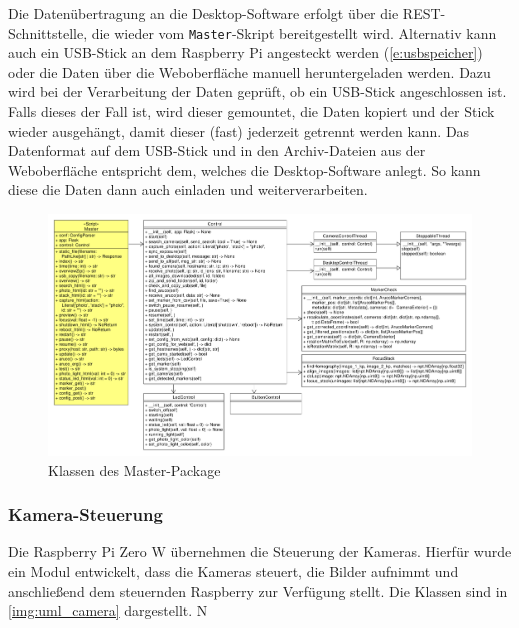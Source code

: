 \documentclass[./00PhotoBox.tex]{subfiles}
\begin{document}
Die Datenübertragung an die Desktop-Software erfolgt über die \Gls{REST}-Schnittstelle, die wieder vom \texttt{Master}-Skript bereitgestellt wird. Alternativ kann auch ein USB-Stick an dem Raspberry Pi angesteckt werden (\autoref{e:usbspeicher}) oder die Daten über die Weboberfläche manuell heruntergeladen werden. Dazu wird bei der Verarbeitung der Daten geprüft, ob ein USB-Stick angeschlossen ist. Falls dieses der Fall ist, wird dieser gemountet, die Daten kopiert und der Stick wieder ausgehängt, damit dieser (fast) jederzeit getrennt werden kann. Das Datenformat auf dem USB-Stick und in den Archiv-Dateien aus der Weboberfläche entspricht dem, welches die Desktop-Software anlegt. So kann diese die Daten dann auch einladen und weiterverarbeiten.

\begin{figure}
    \centering
    \includegraphics[width=1\textwidth]{./img/uml/uml_master_classdiagramm.pdf}
    \caption{Klassen des Master-Package} %
    \label{img:master} %
\end{figure}


\subsubsection{Kamera-Steuerung}
Die Raspberry Pi Zero W übernehmen die Steuerung der Kameras. Hierfür wurde ein Modul entwickelt, dass die Kameras steuert, die Bilder aufnimmt und anschließend dem steuernden Raspberry zur Verfügung stellt. Die Klassen sind in \autoref{img:uml_camera} dargestellt. N
\end{document}
